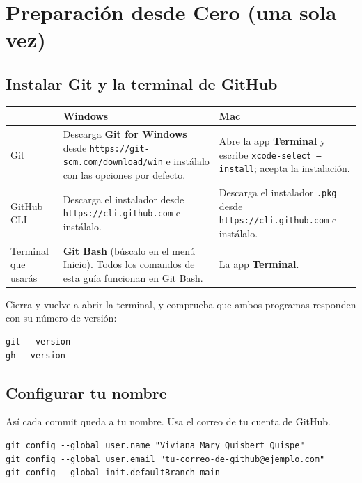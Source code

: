 \documentclass[11pt,a4paper]{article}
\begin{document}
\section{Preparación desde Cero (una sola vez)}

\subsection{Instalar Git y la terminal de GitHub}
{\small
{}
\noindent\begin{tabularx}{\textwidth}{@{}P{2.2cm} L L@{}}
\toprule
{}
& \textbf{Windows} & \textbf{Mac} \\
\midrule
Git & Descarga \textbf{Git for Windows} desde \nolinkurl{https://git-scm.com/download/win} e instálalo con las opciones por defecto. & Abre la app \textbf{Terminal} y escribe \texttt{xcode-select --install}; acepta la instalación. \\
GitHub CLI & Descarga el instalador desde \nolinkurl{https://cli.github.com} e instálalo. & Descarga el instalador \texttt{.pkg} desde \nolinkurl{https://cli.github.com} e instálalo. \\
Terminal que usarás & \textbf{Git Bash} (búscalo en el menú Inicio). Todos los comandos de esta guía funcionan en Git Bash. & La app \textbf{Terminal}. \\
\bottomrule
\end{tabularx}
}

\vspace{0.1cm}
\noindent Cierra y vuelve a abrir la terminal, y comprueba que ambos programas responden con su número de versión:

\begin{lstlisting}
git --version
gh --version
\end{lstlisting}

\subsection{Configurar tu nombre}
Así cada commit queda a tu nombre. Usa el correo de tu cuenta de GitHub.

\begin{lstlisting}
git config --global user.name "Viviana Mary Quisbert Quispe"
git config --global user.email "tu-correo-de-github@ejemplo.com"
git config --global init.defaultBranch main
\end{lstlisting}

\end{document}
